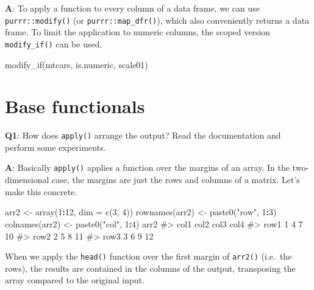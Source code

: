 \documentclass[
]{krantz}
\makeatletter
\newenvironment{Shaded}{\begin{snugshade}}{\end{snugshade}}
\newcommand{\CommentTok}[1]{\textcolor[rgb]{0.56,0.35,0.01}{\textit{#1}}}
\newcommand{\DataTypeTok}[1]{\textcolor[rgb]{0.13,0.29,0.53}{#1}}
\newcommand{\DecValTok}[1]{\textcolor[rgb]{0.00,0.00,0.81}{#1}}
\newcommand{\KeywordTok}[1]{\textcolor[rgb]{0.13,0.29,0.53}{\textbf{#1}}}
\newcommand{\NormalTok}[1]{#1}
\newcommand{\OperatorTok}[1]{\textcolor[rgb]{0.81,0.36,0.00}{\textbf{#1}}}
\newcommand{\StringTok}[1]{\textcolor[rgb]{0.31,0.60,0.02}{#1}}
\newenvironment{kframe}{%
\medskip{}
\setlength{\fboxsep}{.8em}
 \def\at@end@of@kframe{}%
 \ifinner\ifhmode%
  \def\at@end@of@kframe{\end{minipage}}%
  \begin{minipage}{\columnwidth}%
 \fi\fi%
 \def\FrameCommand##1{\hskip\@totalleftmargin \hskip-\fboxsep
 \colorbox{shadecolor}{##1}\hskip-\fboxsep
     \hskip-\linewidth \hskip-\@totalleftmargin \hskip\columnwidth}%
 \MakeFramed {\advance\hsize-\width
   \@totalleftmargin\z@ \linewidth\hsize
   \@setminipage}}%
 {\par\unskip\endMakeFramed%
 \at@end@of@kframe}
\renewenvironment{Shaded}{\begin{kframe}}{\end{kframe}}
\renewcommand{\KeywordTok} [1]{\textcolor[rgb]{0.00,0.44,0.13}{{#1}}}
\renewcommand{\DataTypeTok}[1]{\textcolor[rgb]{0.56,0.13,0.00}{{#1}}}
\renewcommand{\DecValTok}  [1]{\textcolor[rgb]{0.25,0.63,0.44}{{#1}}}
\renewcommand{\StringTok}  [1]{\textcolor[rgb]{0.25,0.44,0.63}{{#1}}}
\renewcommand{\CommentTok} [1]{\textcolor[rgb]{0.38,0.63,0.69}{{#1}}}
\renewcommand{\NormalTok}  [1]{{#1}}
\makeatother
\begin{document}
\textbf{{A}}: To apply a function to every column of a data frame, we can use \texttt{purrr::modify()} (or \texttt{purrr::map\_dfr()}), which also conveniently returns a data frame. To limit the application to numeric columns, the scoped version \texttt{modify\_if()} can be used.

\begin{Shaded}
\begin{Highlighting}[]
\KeywordTok{modify_if}\NormalTok{(mtcars, is.numeric, scale01)}
\end{Highlighting}
\end{Shaded}

\hypertarget{base-functionals}{%
\section{Base functionals}\label{base-functionals}}

\textbf{{Q1}}: How does \texttt{apply()} arrange the output? Read the documentation and perform some experiments.

\textbf{{A}}: Basically \texttt{apply()} applies a function over the margins of an array. In the two-dimensional case, the margins are just the rows and columns of a matrix. Let's make this concrete.

\begin{Shaded}
\begin{Highlighting}[]
\NormalTok{arr2 <-}\StringTok{ }\KeywordTok{array}\NormalTok{(}\DecValTok{1}\OperatorTok{:}\DecValTok{12}\NormalTok{, }\DataTypeTok{dim =} \KeywordTok{c}\NormalTok{(}\DecValTok{3}\NormalTok{, }\DecValTok{4}\NormalTok{))}
\KeywordTok{rownames}\NormalTok{(arr2) <-}\StringTok{ }\KeywordTok{paste0}\NormalTok{(}\StringTok{"row"}\NormalTok{, }\DecValTok{1}\OperatorTok{:}\DecValTok{3}\NormalTok{)}
\KeywordTok{colnames}\NormalTok{(arr2) <-}\StringTok{ }\KeywordTok{paste0}\NormalTok{(}\StringTok{"col"}\NormalTok{, }\DecValTok{1}\OperatorTok{:}\DecValTok{4}\NormalTok{)}
\NormalTok{arr2}
\CommentTok{#>      col1 col2 col3 col4}
\CommentTok{#> row1    1    4    7   10}
\CommentTok{#> row2    2    5    8   11}
\CommentTok{#> row3    3    6    9   12}
\end{Highlighting}
\end{Shaded}

When we apply the \texttt{head()} function over the first margin of \texttt{arr2()} (i.e.~the rows), the results are contained in the columns of the output, transposing the array compared to the original input.
\end{document}
